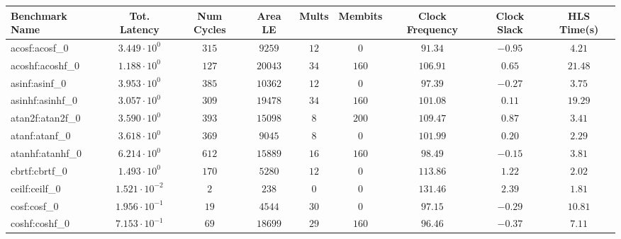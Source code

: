 \begin{tabular}{|l|c|c|c|c|c|c|c|c|}
\hline
Benchmark Name               & Tot. Latency            & Num Cycles & Area LE    & Mults   & Membits  & Clock Frequency & Clock Slack & HLS Time(s) \\
\hline
acosf:acosf\_0               & $ 3.449 \cdot 10^{0}  $ & $ 315    $ & $ 9259   $ & $ 12  $ & $ 0    $ & $ 91.34       $ & $ -0.95   $ & $ 4.21    $ \\
acoshf:acoshf\_0             & $ 1.188 \cdot 10^{0}  $ & $ 127    $ & $ 20043  $ & $ 34  $ & $ 160  $ & $ 106.91      $ & $ 0.65    $ & $ 21.48   $ \\
asinf:asinf\_0               & $ 3.953 \cdot 10^{0}  $ & $ 385    $ & $ 10362  $ & $ 12  $ & $ 0    $ & $ 97.39       $ & $ -0.27   $ & $ 3.75    $ \\
asinhf:asinhf\_0             & $ 3.057 \cdot 10^{0}  $ & $ 309    $ & $ 19478  $ & $ 34  $ & $ 160  $ & $ 101.08      $ & $ 0.11    $ & $ 19.29   $ \\
atan2f:atan2f\_0             & $ 3.590 \cdot 10^{0}  $ & $ 393    $ & $ 15098  $ & $ 8   $ & $ 200  $ & $ 109.47      $ & $ 0.87    $ & $ 3.41    $ \\
atanf:atanf\_0               & $ 3.618 \cdot 10^{0}  $ & $ 369    $ & $ 9045   $ & $ 8   $ & $ 0    $ & $ 101.99      $ & $ 0.20    $ & $ 2.29    $ \\
atanhf:atanhf\_0             & $ 6.214 \cdot 10^{0}  $ & $ 612    $ & $ 15889  $ & $ 16  $ & $ 160  $ & $ 98.49       $ & $ -0.15   $ & $ 3.81    $ \\
cbrtf:cbrtf\_0               & $ 1.493 \cdot 10^{0}  $ & $ 170    $ & $ 5280   $ & $ 12  $ & $ 0    $ & $ 113.86      $ & $ 1.22    $ & $ 2.02    $ \\
ceilf:ceilf\_0               & $ 1.521 \cdot 10^{-2} $ & $ 2      $ & $ 238    $ & $ 0   $ & $ 0    $ & $ 131.46      $ & $ 2.39    $ & $ 1.81    $ \\
cosf:cosf\_0                 & $ 1.956 \cdot 10^{-1} $ & $ 19     $ & $ 4544   $ & $ 30  $ & $ 0    $ & $ 97.15       $ & $ -0.29   $ & $ 10.81   $ \\
coshf:coshf\_0               & $ 7.153 \cdot 10^{-1} $ & $ 69     $ & $ 18699  $ & $ 29  $ & $ 160  $ & $ 96.46       $ & $ -0.37   $ & $ 7.11    $ \\

\end{tabular}
